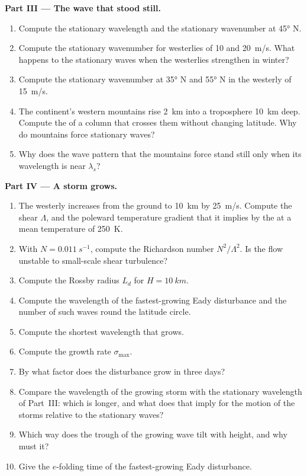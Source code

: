 \begin{problem}
\medskip\noindent\textbf{Part III --- The wave that stood still.}
\begin{enumerate}[resume]
\item Compute the stationary wavelength and the stationary wavenumber at
  \ang{45} N.
\item Compute the stationary wavenumber for westerlies of 10 and
  \qty{20}{m/s}. What happens to the stationary waves when the westerlies
  strengthen in winter?
\item Compute the stationary wavenumber at \ang{35} N and \ang{55} N in the
  westerly of \qty{15}{m/s}.
\item The continent's western mountains rise \qty{2}{km} into a
  troposphere \qty{10}{km} deep. Compute the  of a column
  that crosses them without changing latitude. Why do mountains force
  stationary waves?
\item Why does the wave pattern that the mountains force stand still
  only when its wavelength is near $\lambda_s$?
\end{enumerate}

\medskip\noindent\textbf{Part IV --- A storm grows.}
\begin{enumerate}[resume]
\item The westerly increases from the ground to \qty{10}{km} by
  \qty{25}{m/s}. Compute the shear $\Lambda$, and the poleward temperature
  gradient that it implies by the  at a mean temperature of
  \qty{250}{K}.
\item With $N = \qty{0.011}{s^{-1}}$, compute the Richardson number
  $N^2/\Lambda^2$. Is the flow unstable to small-scale shear turbulence?
\item Compute the Rossby radius $L_d$ for $H = \qty{10}{km}$.
\item Compute the wavelength of the fastest-growing Eady disturbance and
  the number of such waves round the latitude circle.
\item Compute the shortest wavelength that grows.
\item Compute the growth rate $\sigma_{\max}$.
\item By what factor does the disturbance grow in three days?
\item Compare the wavelength of the growing storm with the stationary
  wavelength of Part~III: which is longer, and what does that imply for the
  motion of the storms relative to the stationary waves?
\item Which way does the trough of the growing wave tilt with height, and
  why must it?
\item Give the $e$-folding time of the fastest-growing Eady disturbance.
\end{enumerate}
\end{problem}
